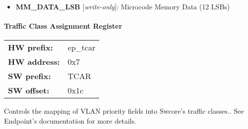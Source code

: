 \vspace{12pt}
\noindent
{}

\begin{itemize}
\item \begin{small}
{\bf 
MM\_DATA\_LSB
} [\emph{write-only}]: Microcode Memory Data (12 LSBs)
\end{small}
\end{itemize}
\paragraph*{Traffic Class Assignment Register}\vspace{12pt}

\begin{tabular}{l l }
{\bf HW prefix:}  & ep\_tcar\\
{\bf HW address:}  & 0x7\\
{\bf SW prefix:}  & TCAR\\
{\bf SW offset:}  & 0x1c\\
\end{tabular}

\vspace{12pt}
Controls the mapping of VLAN priority fields into Swcore's traffic classes.. See Endpoint's documentation for more details.

